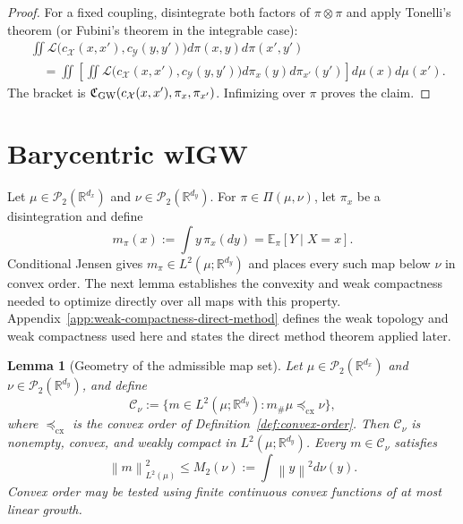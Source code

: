 \documentclass[11pt]{article}
\newcommand{\R}{\mathbb R}
\newcommand{\E}{\mathbb E}
\newcommand{\cP}{\mathcal P}
\newcommand{\norm}[1]{\left\lVert #1\right\rVert}
\newcommand{\cx}{\preceq_{\mathrm{cx}}}
\theoremstyle{plain}
\newtheorem{lemma}[theorem]{Lemma}
\theoremstyle{definition}
\theoremstyle{remark}
\begin{document}
\begin{proof}
For a fixed coupling, disintegrate both factors of $\pi\otimes\pi$ and apply
Tonelli's theorem (or Fubini's theorem in the integrable case):
\[
\begin{aligned}
 &\iint\mathcal L\big(c_{\mathcal X}(x,x'),c_{\mathcal Y}(y,y')\big)
 d\pi(x,y)d\pi(x',y')\\
 &\quad=\iint\left[\iint\mathcal L\big(c_{\mathcal X}(x,x'),
 c_{\mathcal Y}(y,y')\big)d\pi_x(y)d\pi_{x'}(y')\right]d\mu(x)d\mu(x').
\end{aligned}
\]
The bracket is $\mathfrak C_{\rm GW}(c_{\mathcal X}(x,x'),\pi_x,\pi_{x'})$.
Infimizing over $\pi$ proves the claim.
\end{proof}

\section{Barycentric wIGW}
\label{sec:wigw-definition}

Let \(\mu\in\cP_2(\R^{d_x})\) and \(\nu\in\cP_2(\R^{d_y})\). For
\(\pi\in\Pi(\mu,\nu)\), let \(\pi_x\) be a disintegration and define
\begin{equation}\label{eq:conditional-mean-map}
  m_\pi(x):=\int y\,\pi_x(dy)=\E_\pi[Y\mid X=x].
\end{equation}
Conditional Jensen gives $m_\pi\in L^2(\mu;\R^{d_y})$ and places every such map
below $\nu$ in convex order. The next lemma establishes the convexity and weak
compactness needed to optimize directly over all maps with this property.
Appendix~\ref{app:weak-compactness-direct-method} defines the weak
topology and weak compactness used here and states the direct method theorem
applied later.

\begin{lemma}[Geometry of the admissible map set]\label{lem:feasible-set}
Let $\mu\in\cP_2(\R^{d_x})$ and $\nu\in\cP_2(\R^{d_y})$, and define
\begin{equation}\label{eq:admissible-map-set}
  \mathcal C_\nu:=
  \{m\in L^2(\mu;\R^{d_y}):m_\#\mu\cx\nu\},
\end{equation}
where $\cx$ is the convex order of Definition~\ref{def:convex-order}. Then
$\mathcal C_\nu$ is nonempty, convex, and weakly compact in
$L^2(\mu;\R^{d_y})$. Every $m\in\mathcal C_\nu$ satisfies
\[
  \norm{m}_{L^2(\mu)}^2\le M_2(\nu):=\int\norm{y}^2d\nu(y).
\]
Convex order may be tested using finite continuous convex functions of at most
linear growth.
\end{lemma}
\end{document}
